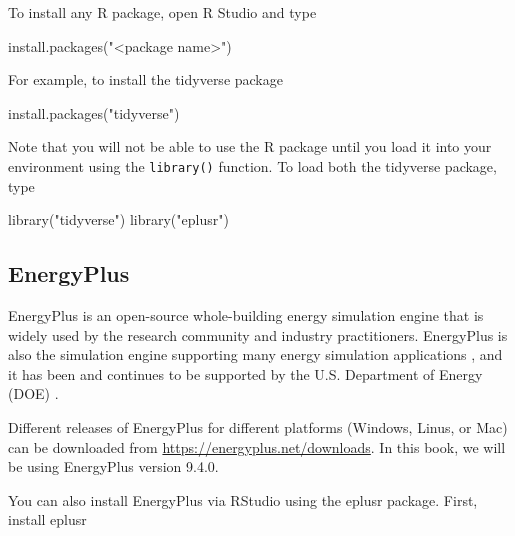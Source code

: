 \documentclass[
]{book}
\newenvironment{Shaded}{\begin{snugshade}}{\end{snugshade}}
\newcommand{\FunctionTok}[1]{\textcolor[rgb]{0.00,0.00,0.00}{#1}}
\newcommand{\NormalTok}[1]{#1}
\newcommand{\StringTok}[1]{\textcolor[rgb]{0.31,0.60,0.02}{#1}}
\begin{document}
To install any R package, open R Studio and type

\begin{Shaded}
\begin{Highlighting}[]
\FunctionTok{install.packages}\NormalTok{(}\StringTok{"\textless{}package name\textgreater{}"}\NormalTok{)}
\end{Highlighting}
\end{Shaded}

For example, to install the tidyverse package

\begin{Shaded}
\begin{Highlighting}[]
\FunctionTok{install.packages}\NormalTok{(}\StringTok{"tidyverse"}\NormalTok{)}
\end{Highlighting}
\end{Shaded}

Note that you will not be able to use the R package until you load it into your environment using the \texttt{library()} function. To load both the tidyverse package, type

\begin{Shaded}
\begin{Highlighting}[]
\FunctionTok{library}\NormalTok{(}\StringTok{"tidyverse"}\NormalTok{)}
\FunctionTok{library}\NormalTok{(}\StringTok{"eplusr"}\NormalTok{)}
\end{Highlighting}
\end{Shaded}

\hypertarget{energyplus}{%
\subsection*{EnergyPlus}\label{energyplus}}

EnergyPlus is an open-source whole-building energy simulation engine that is widely used by the research community and industry practitioners. EnergyPlus is also the simulation engine supporting many energy simulation applications \citep{noauthor_best_nodate}, and it has been and continues to be supported by the U.S. Department of Energy (DOE) \citep{noauthor_energyplus_nodate}.

Different releases of EnergyPlus for different platforms (Windows, Linus, or Mac) can be downloaded from \url{https://energyplus.net/downloads}. In this book, we will be using EnergyPlus version 9.4.0.

You can also install EnergyPlus via RStudio using the eplusr package. First, install eplusr
\end{document}
